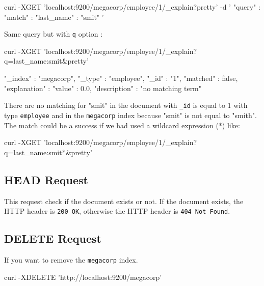 \documentclass{article}%
\begin{document}
\begin{command}
curl -XGET 'localhost:9200/megacorp/employee/1/_explain?pretty' -d '
{
	"query" : {
		"match" : {
			"last_name" : "smit" 
		}
	}
}'
\end{command}

Same query but with \texttt{q} option :
\begin{command}
curl -XGET 'localhost:9200/megacorp/employee/1/_explain?q=last_name:smit&pretty'
\end{command}

\begin{command}
{
	"_index" : "megacorp",
	"_type" : "employee",
	"_id" : "1",
	"matched" : false,
	"explanation" : {
		"value" : 0.0,
		"description" : "no matching term"
	}
}
\end{command}

There are no matching for "smit" in the document with \texttt{\_id} is equal to 1 with type \texttt{employee} and in the \texttt{megacorp} index because "smit" is not equal to "smith". The match could be a success if we had used a wildcard expression (*) like:

\begin{command}
curl -XGET 'localhost:9200/megacorp/employee/1/_explain?q=last_name:smit*&pretty'
\end{command}

\subsection{HEAD Request}

This request check if the document exists or not. If the document exists, the HTTP header is \texttt{200 OK}, otherwise the HTTP header is \texttt{404 Not Found}.

\subsection{DELETE Request}

If you want to remove the \texttt{megacorp} index.

\begin{command}
curl -XDELETE 'http://localhost:9200/megacorp'
\end{command}


\end{document}
